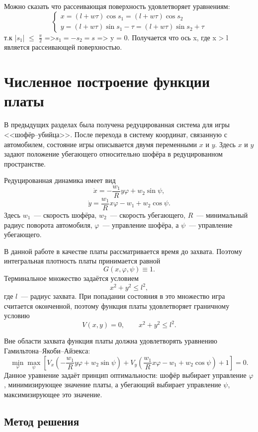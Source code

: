 \documentclass[14pt,a4paper]{extarticle}
\begin{document}
	Можно сказать что рассеивающая поверхность удовлетворяет уравнениям:
	\begin{equation*}
		\begin{cases}
			x = (l + w\tau)\cos{s_1} = (l + w\tau)\cos{s_2}\\
			y = (l + w\tau)\sin{s_1} - \tau = (l + w\tau)\sin{s_2} + \tau
		\end{cases}
	\end{equation*}
	т.к |$s_1$| $\leq$ $\frac{\pi}{2}$ =>$s_1 = -s_2 = s$ => y = 0. Получается что ось x, где x > l является рассеивающей поверхностью.
	\section{Численное построение функции платы}\label{sec:numeric}
	
	В предыдущих разделах была получена редуцированная система для игры
	<<шофёр--убийца>>. После перехода в систему координат, связанную с
	автомобилем, состояние игры описывается двумя переменными $x$ и $y$.
	Здесь $x$ и $y$ задают положение убегающего относительно шофёра в
	редуцированном пространстве.
	
	Редуцированная динамика имеет вид
	\[
	\dot{x}
	=
	-\frac{w_1}{R}y\varphi+w_2\sin\psi,
	\]
	\[
	\dot{y}
	=
	\frac{w_1}{R}x\varphi-w_1+w_2\cos\psi.
	\]
	Здесь $w_1$~--- скорость шофёра, $w_2$~--- скорость убегающего,
	$R$~--- минимальный радиус поворота автомобиля, $\varphi$~--- управление
	шофёра, а $\psi$~--- управление убегающего.
	
	В данной работе в качестве платы рассматривается время до захвата.
	Поэтому интегральная плотность платы принимается равной
	\[
	G(x,\varphi,\psi)\equiv 1.
	\]
	Терминальное множество задаётся условием
	\[
	x^2+y^2\leq l^2,
	\]
	где $l$~--- радиус захвата. При попадании состояния в это множество игра
	считается оконченной, поэтому функция платы удовлетворяет граничному
	условию
	\[
	V(x,y)=0,
	\qquad
	x^2+y^2\leq l^2.
	\]
	
	Вне области захвата функция платы должна удовлетворять уравнению
	Гамильтона--Якоби--Айзекса:
	\[
	\min_{\varphi}\max_{\psi}
	\left[
	V_x\left(
	-\frac{w_1}{R}y\varphi+w_2\sin\psi
	\right)
	+
	V_y\left(
	\frac{w_1}{R}x\varphi-w_1+w_2\cos\psi
	\right)
	+1
	\right]
	=0.
	\]
	Данное уравнение задаёт принцип оптимальности: шофёр выбирает управление
	$\varphi$, минимизирующее значение платы, а убегающий выбирает управление
	$\psi$, максимизирующее это значение.
	
	\subsection{Метод решения}
\end{document}
